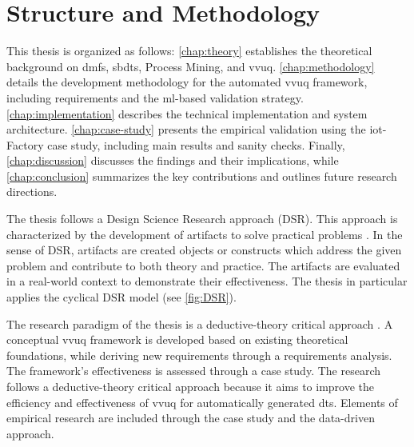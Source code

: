 \section{Structure and Methodology}

This thesis is organized as follows: \autoref{chap:theory} establishes the theoretical background on \gls{dmfs}, \gls{sbdt}s, Process Mining, and \gls{vvuq}. \autoref{chap:methodology} details the development methodology for the automated \gls{vvuq} framework, including requirements and the \gls{ml}-based validation strategy. \autoref{chap:implementation} describes the technical implementation and system architecture. \autoref{chap:case-study} presents the empirical validation using the \gls{iot}-Factory case study, including main results and sanity checks. Finally, \autoref{chap:discussion} discusses the findings and their implications, while \autoref{chap:conclusion} summarizes the key contributions and outlines future research directions.

The thesis follows a Design Science Research approach (DSR). This approach is characterized by the development of artifacts to solve practical problems \autocite{hevner2004design,peffers2007design}. In the sense of DSR, artifacts are created objects or constructs which address the given problem and contribute to both theory and practice. The artifacts are evaluated in a real-world context to demonstrate their effectiveness. The thesis in particular applies the cyclical DSR model (see \autoref{fig:DSR}).

The research paradigm of the thesis is a deductive-theory critical approach \autocite{eberhard1987einfuhrung}. A conceptual \gls{vvuq} framework is developed based on existing theoretical foundations, while deriving new requirements through a requirements analysis. The framework's effectiveness is assessed through a case study. The research follows a deductive-theory critical approach because it aims to improve the efficiency and effectiveness of \gls{vvuq} for automatically generated \gls{dt}s. Elements of empirical research are included through the case study and the data-driven approach.

